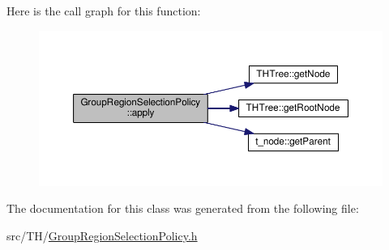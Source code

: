Here is the call graph for this function\+:
\nopagebreak
\begin{figure}[H]
\begin{center}
\leavevmode
\includegraphics[width=350pt]{classGroupRegionSelectionPolicy_a28a39331dafaa273d30bef8f0da9e4fb_cgraph}
\end{center}
\end{figure}




The documentation for this class was generated from the following file\+:\begin{DoxyCompactItemize}
\item 
src/\+T\+H/\hyperlink{GroupRegionSelectionPolicy_8h}{Group\+Region\+Selection\+Policy.\+h}\end{DoxyCompactItemize}
